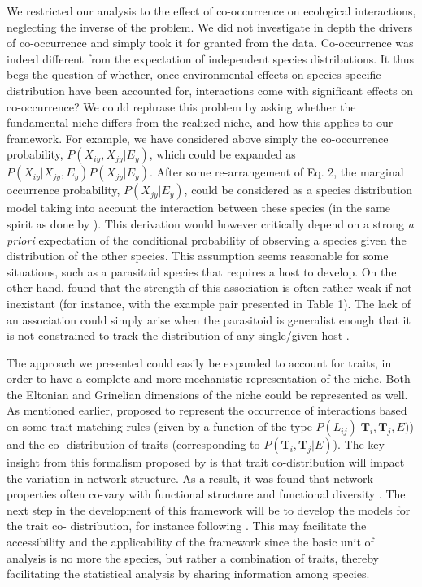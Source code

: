 \documentclass[12pt]{article}
\begin{document}
We restricted our analysis to the effect of co-occurrence on ecological
interactions, neglecting the inverse of the problem. We did not investigate in
depth the drivers of co-occurrence and simply took it for granted from the
data. Co-occurrence was indeed different from the expectation of independent
species distributions. It thus begs the question of whether, once
environmental effects on species-specific distribution have been accounted
for, interactions come with significant effects on co-occurrence? We could
rephrase this problem by asking whether the fundamental niche differs from the
realized niche, and how this applies to our framework. For example, we have
considered above simply the co-occurrence probability, $P(X_{iy},X_{jy}|E_y)$,
which could be expanded as $P(X_{iy}|X_{jy},E_y) P(X_{jy}| E_y )$. After some
re-arrangement of Eq. 2, the marginal occurrence probability, $P(X_{jy}|E_y
)$, could be considered as a species distribution model taking into account
the interaction between these species (in the same spirit as done by
\citealt{GonzalezSalasar2013}). This derivation would however critically
depend on a strong \emph{a priori} expectation of the conditional probability
of observing a species given the distribution of the other species. This
assumption seems reasonable for some situations, such as a parasitoid species
that requires a host to develop. On the other hand, \citet{Cazelles2016b}
found that the strength of this association is often rather weak if not
inexistant (for instance, with the example pair presented in Table 1). The lack
of an association could simply arise when the parasitoid is generalist enough
that it is not constrained to track the distribution of any single/given host
\citep{Cazelles2015}.

The approach we presented could easily be expanded to account for traits, in
order to have a complete and more mechanistic representation of the niche.
Both the Eltonian and Grinelian dimensions of the niche could be represented
as well. As mentioned earlier, \citealt{Gravel2016} proposed to represent the
occurrence of interactions based on some trait-matching rules (given by a
function of the type $P(L_{ij})|\mathbf{T}_i, \mathbf{T}_j, E)$) and the co-
distribution of traits (corresponding to $P(\mathbf{T}_i, \mathbf{T}_j|E)$).
The key  insight from this formalism proposed by \citealt{Gravel2016} is that
trait co-distribution will impact the variation in network structure. As a
result, it was found that network properties often co-vary with functional
structure and functional diversity \citealp{Laigle2018}. The next step in the
development of this framework will be to develop the models for the trait co-
distribution, for instance following \citealt{Ovaskainen2017}. This may
facilitate the accessibility and the applicability of the framework since the
basic unit of analysis is no more the species, but rather a combination of
traits, thereby facilitating the statistical analysis by sharing information
among species.
\end{document}
